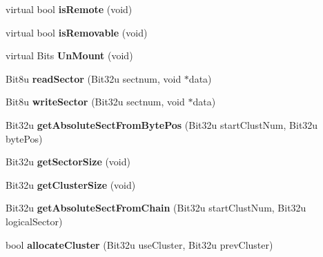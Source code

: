 \begin{DoxyCompactItemize}
\item 
\hypertarget{classfatDrive_a99edbe351256de3a70e3260fd9bf8df1}{virtual bool {\bfseries is\-Remote} (void)}\label{classfatDrive_a99edbe351256de3a70e3260fd9bf8df1}

\item 
\hypertarget{classfatDrive_a82f0f54ae1d64d62156b03c2f61f347f}{virtual bool {\bfseries is\-Removable} (void)}\label{classfatDrive_a82f0f54ae1d64d62156b03c2f61f347f}

\item 
\hypertarget{classfatDrive_ae4f1277e3b57d312737f2ece5785b2a9}{virtual Bits {\bfseries Un\-Mount} (void)}\label{classfatDrive_ae4f1277e3b57d312737f2ece5785b2a9}

\item 
\hypertarget{classfatDrive_a97bc6dda9d3bec5a85ef2382c0b26654}{Bit8u {\bfseries read\-Sector} (Bit32u sectnum, void $\ast$data)}\label{classfatDrive_a97bc6dda9d3bec5a85ef2382c0b26654}

\item 
\hypertarget{classfatDrive_a5c105a99ce90237b34f5a57a915042d7}{Bit8u {\bfseries write\-Sector} (Bit32u sectnum, void $\ast$data)}\label{classfatDrive_a5c105a99ce90237b34f5a57a915042d7}

\item 
\hypertarget{classfatDrive_ac865cd5b15f0a72a122783abdb9decbb}{Bit32u {\bfseries get\-Absolute\-Sect\-From\-Byte\-Pos} (Bit32u start\-Clust\-Num, Bit32u byte\-Pos)}\label{classfatDrive_ac865cd5b15f0a72a122783abdb9decbb}

\item 
\hypertarget{classfatDrive_ad2affae0064e689be43f4b081e8ae86b}{Bit32u {\bfseries get\-Sector\-Size} (void)}\label{classfatDrive_ad2affae0064e689be43f4b081e8ae86b}

\item 
\hypertarget{classfatDrive_ac9e9fc2d188b9e94e58366bf7a1a8be5}{Bit32u {\bfseries get\-Cluster\-Size} (void)}\label{classfatDrive_ac9e9fc2d188b9e94e58366bf7a1a8be5}

\item 
\hypertarget{classfatDrive_ab31954a5996df17bbd27e17f4fbc26d6}{Bit32u {\bfseries get\-Absolute\-Sect\-From\-Chain} (Bit32u start\-Clust\-Num, Bit32u logical\-Sector)}\label{classfatDrive_ab31954a5996df17bbd27e17f4fbc26d6}

\item 
\hypertarget{classfatDrive_a77ee4b8cfb4e4fa3f3f63315c827c5aa}{bool {\bfseries allocate\-Cluster} (Bit32u use\-Cluster, Bit32u prev\-Cluster)}\label{classfatDrive_a77ee4b8cfb4e4fa3f3f63315c827c5aa}


\end{DoxyCompactItemize}
